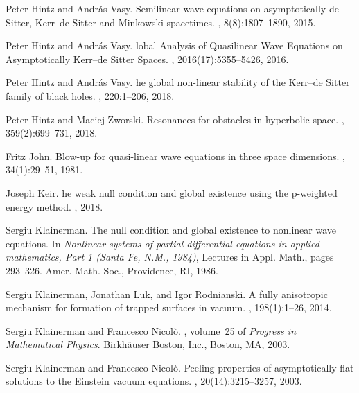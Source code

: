 \documentclass[reqno,11pt,letterpaper]{amsart}
\numberwithin{equation}{section}
\numberwithin{figure}{section}
\theoremstyle{definition}
\theoremstyle{remark}
\begin{document}
\begin{thebibliography}{GCHMG05}
Peter Hintz and Andr{\'a}s Vasy.
\newblock Semilinear wave equations on asymptotically de {S}itter, {K}err--de
  {S}itter and {M}inkowski spacetimes.
, 8(8):1807--1890, 2015.

Peter Hintz and Andr{\'a}s Vasy.
lobal {A}nalysis of {Q}uasilinear {W}ave {E}quations on
  {A}symptotically {K}err--de {S}itter {S}paces.
,
  2016(17):5355--5426, 2016.

Peter Hintz and Andr{\'a}s Vasy.
he global non-linear stability of the {K}err--de {S}itter family
  of black holes.
, 220:1--206, 2018.

Peter Hintz and Maciej Zworski.
\newblock Resonances for obstacles in hyperbolic space.
, 359(2):699--731, 2018.

Fritz John.
\newblock Blow-up for quasi-linear wave equations in three space dimensions.
, 34(1):29--51,
  1981.

Joseph Keir.
he weak null condition and global existence using the p-weighted
  energy method.
, 2018.

Sergiu Klainerman.
\newblock The null condition and global existence to nonlinear wave equations.
\newblock In {\em Nonlinear systems of partial differential equations in
  applied mathematics, {P}art 1 ({S}anta {F}e, {N}.{M}., 1984)}, Lectures in
  Appl. Math., pages 293--326. Amer. Math. Soc., Providence, RI, 1986.

Sergiu Klainerman, Jonathan Luk, and Igor Rodnianski.
\newblock A fully anisotropic mechanism for formation of trapped surfaces in
  vacuum.
, 198(1):1--26, 2014.

Sergiu Klainerman and Francesco Nicol\`o.
, volume~25 of {\em
  Progress in Mathematical Physics}.
\newblock Birkh\"auser Boston, Inc., Boston, MA, 2003.

Sergiu Klainerman and Francesco Nicol\`o.
\newblock Peeling properties of asymptotically flat solutions to the {E}instein
  vacuum equations.
, 20(14):3215--3257, 2003.


\end{thebibliography}
\end{document}
